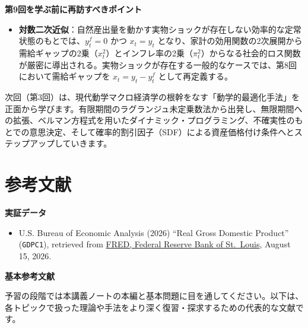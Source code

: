 \documentclass[
  japanese,
  lualatex,
  ja=standard,
  12pt,
  a4paper]{ltjsarticle}
\providecommand{\tightlist}{%
  \setlength{\itemsep}{0pt}\setlength{\parskip}{0pt}}
\begin{document}
\textbf{第9回を学ぶ前に再訪すべきポイント}

\begin{itemize}
\tightlist
\item
  \textbf{対数二次近似}：自然産出量を動かす実物ショックが存在しない効率的な定常状態のもとでは、\(y_t^f=0\)
  かつ \(x_t=y_t\)
  となり、家計の効用関数の2次展開から需給ギャップの2乗（\(x_t^2\)）とインフレ率の2乗（\(\pi_t^2\)）からなる社会的ロス関数が厳密に導出される。実物ショックが存在する一般的なケースでは、第8回において需給ギャップを
  \(x_t=y_t-y_t^f\) として再定義する。
\end{itemize}

次回（第3回）は、現代動学マクロ経済学の根幹をなす「動学的最適化手法」を正面から学びます。有限期間のラグランジュ未定乗数法から出発し、無限期間への拡張、ベルマン方程式を用いたダイナミック・プログラミング、不確実性のもとでの意思決定、そして確率的割引因子（SDF）による資産価格付け条件へとステップアップしていきます。

\section{参考文献}\label{ux53c2ux8003ux6587ux732e}

\textbf{実証データ}

\begin{itemize}
\tightlist
\item
  U.S. Bureau of Economic Analysis (2026) ``Real Gross Domestic
  Product'' (\texttt{GDPC1}), retrieved from
  \href{https://fred.stlouisfed.org/series/GDPC1}{FRED, Federal Reserve
  Bank of St.~Louis}, August 15, 2026.
\end{itemize}

\textbf{基本参考文献}

予習の段階では本講義ノートの本編と基本問題に目を通してください。以下は、各トピックで扱った理論や手法をより深く復習・探求するための代表的な文献です。
\end{document}
